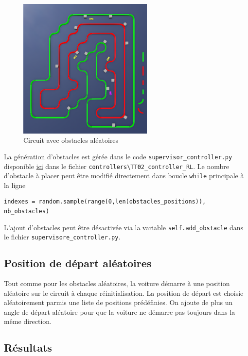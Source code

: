 \documentclass[french]{article}
\begin{document}
\begin{figure}[H]
    \centering
    \includegraphics[width=0.6\textwidth]{Images/random_obs.png}
    \caption{Circuit avec obstacles aléatoires}
    \label{fig:random_obs}
\end{figure}

\vspace{0.5cm}
La génération d'obstacles est gérée dans le code \verb|supervisor_controller.py| disponible \href{https://github.com/basileplus/RCAutonomousCar/tree/main/simulatedCar}{ici} dans le fichier \verb|controllers\TT02_controller_RL|. Le nombre d'obstacle à placer peut être modifié directement dans boucle \verb|while| principale à la ligne
\begin{lstlisting}
indexes = random.sample(range(0,len(obstacles_positions)), nb_obstacles)
\end{lstlisting}

L'ajout d'obstacles peut être désactivée via la variable \verb|self.add_obstacle| dans le fichier \verb|supervisore_controller.py|.

\subsection{Position de départ aléatoires}

Tout comme pour les obstacles aléatoires, la voiture démarre à une position aléatoire sur le circuit à chaque réinitialisation. La position de départ est choisie aléatoirement parmis une liste de positions prédéfinies. On ajoute de plus un angle de départ aléatoire pour que la voiture ne démarre pas toujours dans la même direction.


\subsection{Résultats}
\end{document}
